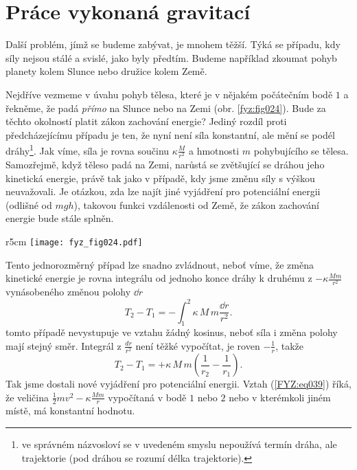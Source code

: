  \section{Práce vykonaná gravitací}
    Další problém, jímž se budeme zabývat, je mnohem těžší. Týká se případu, kdy síly nejsou stálé 
    a svislé, jako byly předtím. Budeme například zkoumat pohyb planety kolem Slunce nebo družice 
    kolem Země.
    
    Nejdříve vezmeme v úvahu pohyb tělesa, které je v nějakém počátečním bodě \(1\) a řekněme, že 
    padá \emph{přímo} na Slunce nebo na Zemi (obr. \ref{fyz:fig024}). Bude za těchto okolností 
    platit zákon zachování energie? Jediný rozdíl proti předcházejícímu případu je ten, že nyní 
    není síla konstantní, ale mění se podél dráhy\footnote{ve správném názvosloví se v uvedeném 
    smyslu nepoužívá termín dráha, ale trajektorie (pod dráhou se rozumí délka trajektorie).}. Jak 
    víme, síla je rovna součinu \(\kappa\frac{M}{r^2}\) a hmotnosti \(m\) pohybujícího se tělesa. 
    Samozřejmě, když těleso padá na Zemi, narůstá se zvětšující se dráhou jeho kinetická energie, 
    právě tak jako v případě, kdy jsme změnu síly s výškou neuvažovali. Je otázkou, zda lze najít 
    jiné vyjádření pro potenciální energii (odlišné od \(mgh\)), takovou funkci vzdálenosti od 
    Země, že zákon zachování energie bude stále splněn.
    
    \begin{wrapfigure}[8]{r}{5cm}  %
      \centering
      \texttt{[image: fyz\_fig024.pdf]}
      \caption{Těleso o malé hmotnosti \(m\) padá pod vlivem gravitace na těleso o velké hmotností 
               \(M\) (\cite[s.~188]{Feynman01})}
      \label{fyz:fig024}
    \end{wrapfigure}
    Tento jednorozměrný případ lze snadno zvládnout, neboť víme, že změna kinetické energie je 
    rovna integrálu od jednoho konce dráhy k druhému z  \(-\kappa\frac{Mm}{r^2}\) vynásobeného 
    změnou polohy \(\dd{r}\)
    \begin{equation}\label{FYZ:eq038}
      T_2 - T_1 = -\int_{1}^{2}\kappa\,M\,m\frac{\dd{r}}{r^2}.
    \end{equation}
    tomto případě nevystupuje ve vztahu žádný kosinus, neboť síla i změna polohy mají stejný směr. 
    Integrál z \(\frac{dr}{r^2}\) není těžké vypočítat, je roven \(-\frac{1}{r}\), takže
    \begin{equation}\label{FYZ:eq039}
      T_2 - T_1 = +\kappa\,M\,m\left(\dfrac{1}{r_2} - \dfrac{1}{r_1}\right).
    \end{equation}
    Tak jsme dostali nové vyjádření pro potenciální energii. Vztah (\ref{FYZ:eq039}) říká, že 
    veličina \(\frac{1}{2}mv^2 - \kappa\frac{Mm}{r}\) vypočítaná v bodě \(1\) nebo \(2\) nebo v 
    kterémkoli jiném místě, má konstantní hodnotu.
    
